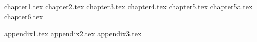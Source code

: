 \documentclass[a4paper,11pt]{book}
\begin{document}
 
\frontmatter

 
\clearpage
\thispagestyle{empty}
 
\tableofcontents
\listoffigures
\listoftables
 
\mainmatter

{chapter1.tex}
{chapter2.tex}
{chapter3.tex}
{chapter4.tex}
{chapter5.tex}
{chapter5a.tex}
{chapter6.tex}

\appendix
{appendix1.tex}
{appendix2.tex}
{appendix3.tex}

 

 
\backmatter


\printbibliography

 
\end{document}
